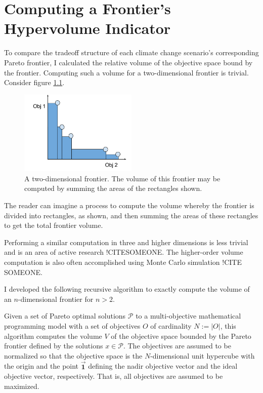  
\chapter{Computing a Frontier's Hypervolume Indicator}
\label{chap:appAHypervolumeAlgo}
To compare the tradeoff structure of each climate change scenario's corresponding Pareto frontier, I calculated the relative volume of the objective space bound by the frontier.  Computing such a volume for a two-dimensional frontier is trivial. Consider figure \ref{fig:2DFrontierVol}.
\begin{figure}[h]
  \centering
    \includegraphics[width=0.5\textwidth]{"../images/2DFrontierVolumeExample"}
  \caption{A two-dimensional frontier. The volume of this frontier may be computed by summing the areas of the rectangles shown.}
  \label{fig:2DFrontierVol}
\end{figure}
The reader can imagine a process to compute the volume whereby the frontier is divided into rectangles, as shown, and then summing the areas of these rectangles to get the total frontier volume.

Performing a similar computation in three and higher dimensions is less trivial and is an area of active research !CITESOMEONE. The higher-order volume computation is also often accomplished using Monte Carlo simulation !CITE SOMEONE.

I developed the following recursive algorithm to exactly compute the volume of an $n$-dimensional frontier for $n>2$.

Given a set of Pareto optimal solutions $\mathcal{P}$ to a multi-objective mathematical programming model with a set of objectives $O$ of cardinality $N := |O|$, this algorithm computes the volume $V$ of the objective space bounded by the Pareto frontier defined by the solutions $x \in \mathcal{P}$. The objectives are assumed to be normalized so that the objective space is the $N$-dimensional unit hypercube with the origin and the point $\vec{\mathbf{1}}$ defining the nadir objective vector and the ideal objective vector, respectively. That is, all objectives are assumed to be maximized.

